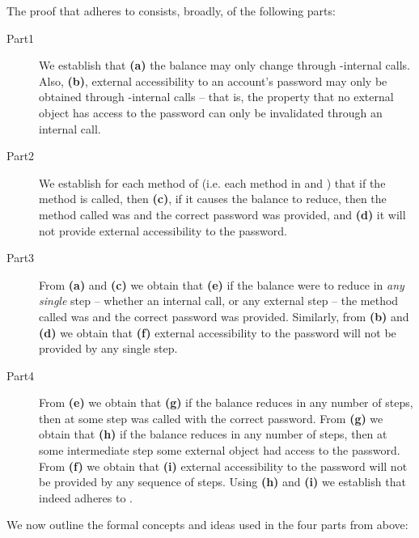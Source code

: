 The proof that  adheres to  consists,
broadly, of the following parts:


\begin{description}
\item[Part1] We establish that  \textbf{(a)} the balance may only change through  
-internal calls.
Also,  \textbf{(b)},   external accessibility to an account's password may 
only be obtained through  -internal calls -- that is,  the property that
no external object has access to the password can only be invalidated through an internal call.
 
\item[Part2] We establish  for each method of  (i.e. each method in  and ) that if the method is called, then 
 \textbf{(c)},  if it  causes the  balance to reduce, then the method called was
  and the correct password was provided, and 
  \textbf{(d)} it will not provide external accessibility to the password.

 \item[Part3]  From \textbf{(a)}  and  \textbf{(c)} we obtain that \textbf{(e)}  if the balance were to 
reduce in \emph{any}  \emph{single} step -- whether an internal call, or any external step --
 the method called was
  and the correct password was provided. Similarly,   from
 \textbf{(b)}  and  \textbf{(d)} we obtain that \textbf{(f)}
 external accessibility to the password will not be provided by any single step.
    
 
\item[Part4] From \textbf{(e)} we obtain that  \textbf{(g)}   if the balance reduces in any 
number of steps, then at some step   was called with   the correct password.
From  \textbf{(g)}  we obtain that \textbf{(h)} if the balance reduces in any 
number of steps, then at some intermediate step some external object had access to the password.
From \textbf{(f)} we obtain that  \textbf{(i)}  external accessibility to the password will not be provided by any sequence of steps.
Using  \textbf{(h)} and  \textbf{(i)}  we establish that
  indeed adheres to .

\end{description} 
 
\noindent
We  now outline  the  formal concepts and ideas used in the four parts   from above:

